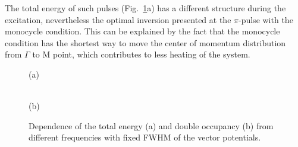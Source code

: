 The total energy of such pulses (Fig.~\ref{fig:Etot_4}a) has a different structure during the excitation, nevertheless the optimal inversion presented at the $\pi$-pulse with the monocycle condition. This can be explained by the fact that the monocycle condition has the shortest way to move the center of momentum distribution from $\Gamma$ to M point, which contributes to less heating of the system. 
\begin{figure}[h!]
\begin{minipage}[h]{0.5\linewidth}
 (a) \\
\end{minipage}
\hfill
\begin{minipage}[h]{0.5\linewidth}
 \\(b)
\end{minipage}
\caption{Dependence of the total energy (a) and double occupancy (b) from different frequencies with fixed FWHM of the vector potentials.}
\label{fig:Etot_4}
\end{figure}

